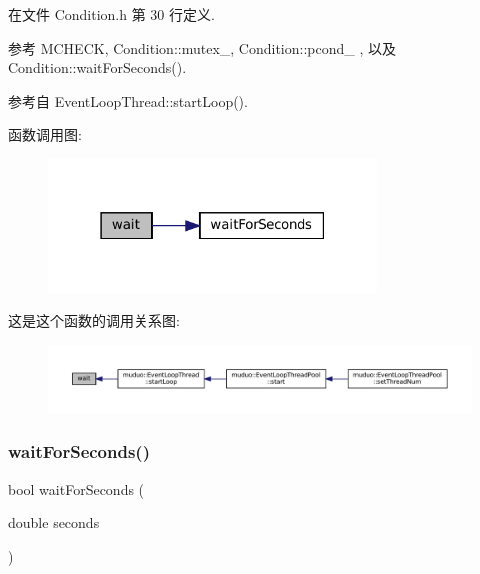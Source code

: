 在文件 Condition.\+h 第 30 行定义.



参考 M\+C\+H\+E\+CK, Condition\+::mutex\+\_\+, Condition\+::pcond\+\_\+ , 以及 Condition\+::wait\+For\+Seconds().



参考自 Event\+Loop\+Thread\+::start\+Loop().

函数调用图\+:
\nopagebreak
\begin{figure}[H]
\begin{center}
\leavevmode
\includegraphics[width=247pt]{classmuduo_1_1Condition_aa3b21853f890838c88d047d6c2786917_cgraph}
\end{center}
\end{figure}
这是这个函数的调用关系图\+:
\nopagebreak
\begin{figure}[H]
\begin{center}
\leavevmode
\includegraphics[width=350pt]{classmuduo_1_1Condition_aa3b21853f890838c88d047d6c2786917_icgraph}
\end{center}
\end{figure}
\mbox{\label{classmuduo_1_1Condition_a73adc43213ab6f784ca7c47923907ac2}} 
\subsubsection{\texorpdfstring{wait\+For\+Seconds()}{waitForSeconds()}}
{\footnotesize\ttfamily bool wait\+For\+Seconds (\begin{DoxyParamCaption}\item[{double}]{seconds }\end{DoxyParamCaption})}



